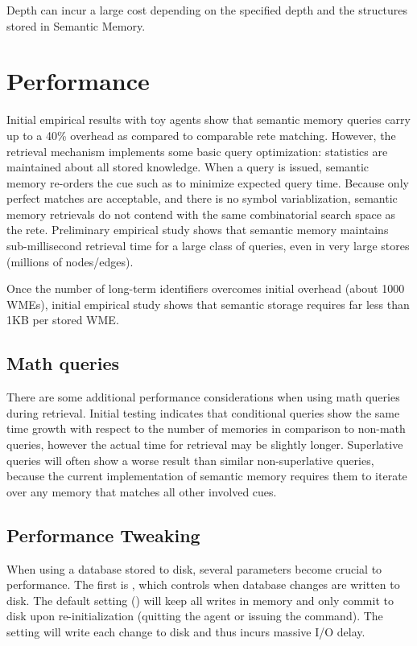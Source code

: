 Depth can incur a large cost depending on the specified depth and the structures stored in Semantic Memory.

\section{Performance}
\label{SMEM-perf}

Initial empirical results with toy agents show that semantic memory queries carry up to a 40\% overhead as compared to comparable rete matching.  
However, the retrieval mechanism implements some basic query optimization: statistics are maintained about all stored knowledge.  
When a query is issued, semantic memory re-orders the cue such as to minimize expected query time.  
Because only perfect matches are acceptable, and there is no symbol variablization, semantic memory retrievals do not contend with the same combinatorial search space as the rete.  
Preliminary empirical study shows that semantic memory maintains sub-millisecond retrieval time for a large class of queries, even in very large stores (millions of nodes/edges).

Once the number of long-term identifiers overcomes initial overhead (about 1000 WMEs), initial empirical study shows that semantic storage requires far less than 1KB per stored WME.

\subsection{Math queries}
There are some additional performance considerations when using math queries during retrieval.
Initial testing indicates that conditional queries show the same time growth with respect to the number of memories in comparison to non-math queries, however the actual time for retrieval may be slightly longer.
Superlative queries will often show a worse result than similar non-superlative queries, because the current implementation of semantic memory requires them to iterate over any memory that matches all other involved cues.

\subsection{Performance Tweaking}

When using a database stored to disk, several parameters become crucial to performance.  
The first is , which controls when database changes are written to disk.   
The default setting () will keep all writes in memory and only commit to disk upon re-initialization (quitting the agent or issuing the  command).  
The  setting will write each change to disk and thus incurs massive I/O delay.

